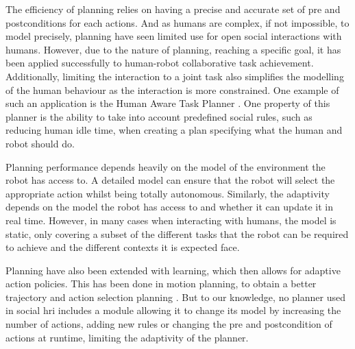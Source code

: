     
    The efficiency of planning relies on having a precise and accurate set of pre and postconditions for each actions. And as humans are complex, if not impossible, to model precisely, planning have seen limited use for open social interactions with humans. However, due to the nature of planning, reaching a specific goal, it has been applied successfully to human-robot collaborative task achievement. Additionally, limiting the interaction to a joint task also simplifies the modelling of the human behaviour as the interaction is more constrained. One example of such an application is the Human Aware Task Planner \citep{alili2009task}. One property of this planner is the ability to take into account predefined social rules, such as reducing human idle time, when creating a plan specifying what the human and robot should do.
    
    Planning performance depends heavily on the model of the environment the robot has access to. A detailed model can ensure that the robot will select the appropriate action whilst being totally autonomous. Similarly, the adaptivity depends on the model the robot has access to and whether it can update it in real time. However, in many cases when interacting with humans, the model is static, only covering a subset of the different tasks that the robot can be required to achieve and the different contexts it is expected face.
    
    
    
    Planning have also been extended with learning, which then allows for adaptive action policies. This has been done in motion planning, to obtain a better trajectory \citep{jain2013learning,beetz2004rpllearn} and action selection planning \citep{kirsch2009robot}. But to our knowledge, no planner used in social \gls{hri} includes a module allowing it to change its model by increasing the number of actions, adding new rules or changing the pre and postcondition of actions at runtime, limiting the adaptivity of the planner.

